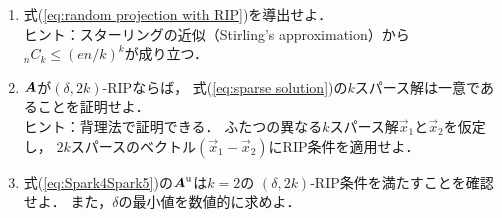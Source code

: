 \begin{enumerate}
\item\yeeks
\label{ex:JL RIP}
式(\ref{eq:random projection with RIP})を導出せよ．\\
ヒント：スターリングの近似（Stirling's approximation）から
${}_nC_k\leq(en/k)^k$が成り立つ．

\item
\label{ex:uniqueness by RIP}
$\mbox{\boldmath $A$}$が$(\delta,2k)$-RIPならば，
式(\ref{eq:sparse solution})の$k$スパース解は一意であることを証明せよ．\\
ヒント：背理法で証明できる．
ふたつの異なる$k$スパース解$\vec x_1$と$\vec x_2$を仮定し，
$2k$スパースのベクトル$(\vec x_1-\vec x_2)$にRIP条件を適用せよ．

\item\yeeks
式(\ref{eq:Spark4Spark5})の$\mbox{\boldmath $A$}^{\mbox{\scriptsize u}}$は$k=2$の
$(\delta,2k)$-RIP条件を満たすことを確認せよ．
また，$\delta$の最小値を数値的に求めよ．
\end{enumerate}




{\footnotesize

}

